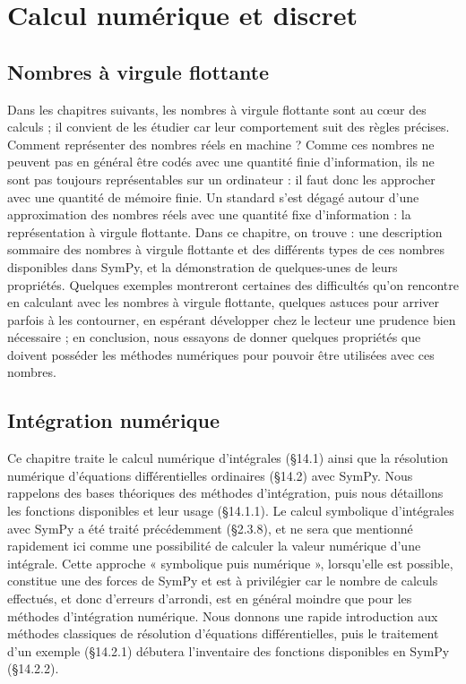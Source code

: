 \part{Calcul numérique et discret}
\chapter{Nombres à virgule flottante}
Dans les chapitres suivants, les nombres à virgule flottante sont au cœur des
calculs ; il convient de les étudier car leur comportement suit des règles précises.
Comment représenter des nombres réels en machine ? Comme ces nombres ne
peuvent pas en général être codés avec une quantité finie d’information, ils ne
sont pas toujours représentables sur un ordinateur : il faut donc les approcher
avec une quantité de mémoire finie.
Un standard s’est dégagé autour d’une approximation des nombres réels avec
une quantité fixe d’information : la représentation à virgule flottante.
Dans ce chapitre, on trouve : une description sommaire des nombres à virgule
flottante et des différents types de ces nombres disponibles dans SymPy, et la 
démonstration de quelques-unes de leurs propriétés. Quelques exemples montreront
certaines des difficultés qu’on rencontre en calculant avec les nombres à virgule
flottante, quelques astuces pour arriver parfois à les contourner, en espérant 
développer chez le lecteur une prudence bien nécessaire ; en conclusion, nous essayons
de donner quelques propriétés que doivent posséder les méthodes numériques pour
pouvoir être utilisées avec ces nombres.

\chapter{Intégration numérique}
Ce chapitre traite le calcul numérique d’intégrales (§14.1) ainsi que la résolution
numérique d'équations différentielles ordinaires (§14.2) avec SymPy. Nous rappelons
des bases théoriques des méthodes d’intégration, puis nous détaillons les fonctions
disponibles et leur usage (§14.1.1). Le calcul symbolique d’intégrales avec SymPy a été traité précédemment (§2.3.8), et ne sera que mentionné rapidement ici comme une possibilité de calculer la
valeur numérique d’une intégrale. Cette approche « symbolique puis numérique »,
lorsqu’elle est possible, constitue une des forces de SymPy et est à privilégier car le
nombre de calculs effectués, et donc d’erreurs d’arrondi, est en général moindre
que pour les méthodes d’intégration numérique. Nous donnons une rapide introduction aux méthodes classiques de résolution d’équations différentielles, puis le traitement d’un exemple (§14.2.1) débutera l’inventaire des fonctions disponibles en SymPy (§14.2.2).

